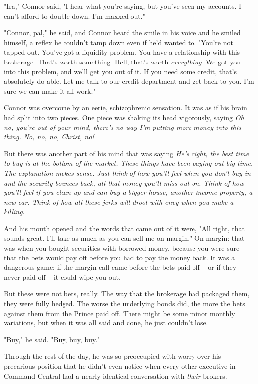 "Ira," Connor said, "I hear what you're saying, but you've seen my
accounts. I can't afford to double down. I'm maxxed out."

"Connor, pal," he said, and Connor heard the smile in his voice and
he smiled himself, a reflex he couldn't tamp down even if he'd
wanted to. "You're not tapped out. You've got a liquidity problem.
You have a relationship with this brokerage. That's worth
something. Hell, that's worth \emph{everything}. We got you into
this problem, and we'll get you out of it. If you need some credit,
that's absolutely do-able. Let me talk to our credit department and
get back to you. I'm sure we can make it all work."

Connor was overcome by an eerie, schizophrenic sensation. It was as
if his brain had split into two pieces. One piece was shaking its
head vigorously, saying
\emph{Oh no, you're out of your mind, there's no way I'm putting more money into this thing. No, no, no, Christ, no!}

But there was another part of his mind that was saying
\emph{He's right, the best time to buy is at the bottom of the market. These things have been paying out big-time. The explanation makes sense. Just think of how you'll feel when you don't buy in and the security bounces back, all that money you'll miss out on. Think of how you'll feel if you clean up and can buy a bigger house, another income property, a new car. Think of how all these jerks will drool with envy when you make a killing}.

And his mouth opened and the words that came out of it were, "All
right, that sounds great. I'll take as much as you can sell me on
margin." On margin: that was when you bought securities with
borrowed money, because you were sure that the bets would pay off
before you had to pay the money back. It was a dangerous game: if
the margin call came before the bets paid off -- or if they never
paid off -- it could wipe you out.

But these were not bets, really. The way that the brokerage had
packaged them, they were fully hedged. The worse the underlying
bonds did, the more the bets against them from the Prince paid off.
There might be some minor monthly variations, but when it was all
said and done, he just couldn't lose.

"Buy," he said. "Buy, buy, buy."

Through the rest of the day, he was so preoccupied with worry over
his precarious position that he didn't even notice when every other
executive in Command Central had a nearly identical conversation
with \emph{their} brokers.

